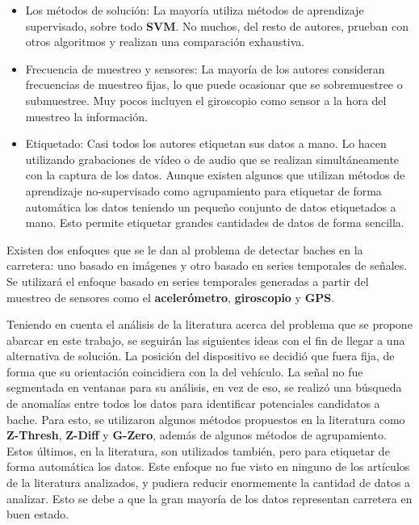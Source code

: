 \begin{itemize}
		\item Los métodos de solución: La mayoría utiliza métodos de aprendizaje supervisado, sobre todo \textbf{SVM}. No muchos, del resto de autores,
			prueban con otros algoritmos y realizan una comparación exhaustiva.

		\item Frecuencia de muestreo y sensores: La mayoría de los autores consideran frecuencias de muestreo fijas, lo que puede ocasionar que se
			sobremuestree o submuestree. Muy pocos incluyen el giroscopio como sensor a la hora del muestreo la información.

		\item Etiquetado: Casi todos los autores etiquetan sus datos a mano. Lo hacen utilizando grabaciones de vídeo o de audio que se realizan 
			simultáneamente con la captura de los datos. Aunque existen algunos que utilizan métodos de aprendizaje no-supervisado como agrupamiento
			para etiquetar de forma automática los datos teniendo un pequeño conjunto de datos etiquetados a mano. Esto permite etiquetar grandes 
			cantidades de datos de forma sencilla.
	\end{itemize}

	Existen dos enfoques que se le dan al problema de detectar baches en la carretera: uno basado en imágenes y otro basado en series 
	temporales de señales. Se utilizará el enfoque basado en series temporales generadas a partir del muestreo de sensores como el
	\textbf{acelerómetro}, \textbf {giroscopio} y \textbf{GPS}.

	Teniendo en cuenta el análisis de la literatura acerca del problema que se propone abarcar en este trabajo, se seguirán las siguientes ideas con el 
	fin de llegar a una alternativa de solución. La posición del dispositivo se decidió que fuera fija, de forma que su orientación
	coincidiera con la del vehículo. La señal no fue segmentada en ventanas para su análisis, en vez de eso, se realizó una búsqueda de anomalías entre
	todos los datos para identificar potenciales candidatos a bache. Para esto, se utilizaron algunos métodos propuestos en la literatura como \textbf
	{Z-Thresh}, \textbf{Z-Diff} y \textbf{G-Zero}, además de algunos métodos de agrupamiento. Estos últimos, en la literatura, son utilizados también,
	pero para etiquetar de forma automática los datos. Este enfoque no fue visto en ninguno de los artículos de la literatura analizados, y pudiera reducir
	enormemente la cantidad de datos a analizar. Esto se debe a que la gran mayoría de los datos representan carretera en buen estado.

